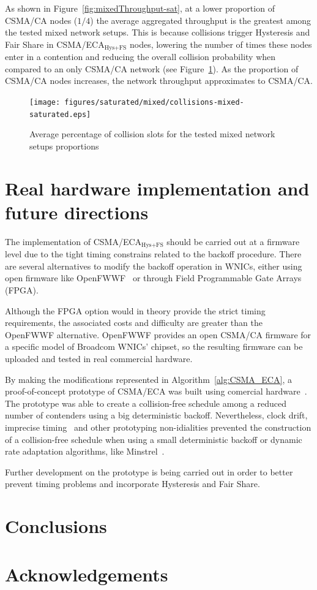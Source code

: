 \documentclass[a4paper,journal]{IEEEtran}
\begin{document}
	As shown in Figure~\ref{fig:mixedThroughput-sat}, at a lower proportion of CSMA/CA nodes ($1/4$) the average aggregated throughput is the greatest among the tested mixed network setups. This is because collisions trigger Hysteresis and Fair Share in CSMA/ECA$_{\text{Hys+FS}}$ nodes, lowering the number of times these nodes enter in a contention and reducing the overall collision probability when compared to an only CSMA/CA network (see Figure~\ref{fig:mixedCollisions-sat}). As the proportion of CSMA/CA nodes increases, the network throughput approximates to CSMA/CA.	

	\begin{figure}[tb]
		\centering
		\texttt{[image: figures/saturated/mixed/collisions-mixed-saturated.eps]}
		\caption{Average percentage of collision slots for the tested mixed network setups proportions}
		\label{fig:mixedCollisions-sat}
	\end{figure}
		

\section{Real hardware implementation and future directions}\label{EDCA}
The implementation of CSMA/ECA$_{\text{Hys+FS}}$ should be carried out at a firmware level due to the tight timing constrains related to the backoff procedure. There are several alternatives to modify the backoff operation in WNICs, either using open firmware like OpenFWWF~\cite{OpenFWWF} or through Field Programmable Gate Arrays (FPGA).

Although the FPGA option would in theory provide the strict timing requirements, the associated costs and difficulty are greater than the OpenFWWF alternative. OpenFWWF provides an open CSMA/CA firmware for a specific model of Broadcom WNICs' chipset, so the resulting firmware can be uploaded and tested in real commercial hardware. 

By making the modifications represented in Algorithm~\ref{alg:CSMA_ECA}, a proof-of-concept prototype of CSMA/ECA was built using comercial hardware~\cite{sanabria2013prototyping}. The prototype was able to create a collision-free schedule among a reduced number of contenders using a big deterministic backoff. Nevertheless, clock drift, imprecise timing~\cite{bianchi2007experimental} and other prototyping non-idialities prevented the construction of a collision-free schedule when using a small deterministic backoff or dynamic rate adaptation algorithms, like Minstrel~\cite{minstrel}.

Further development on the prototype is being carried out in order to better prevent timing problems and incorporate Hysteresis and Fair Share.

\section{Conclusions}\label{conclusions}
\section{Acknowledgements}




\end{document}

